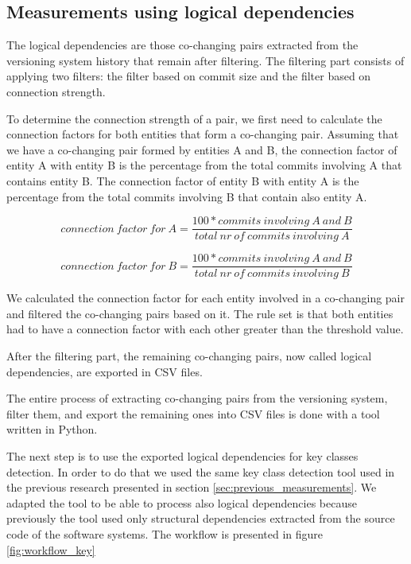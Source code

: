 \documentclass[12pt]{mitthesis}
\begin{document}
\subsection{Measurements using logical dependencies}
\label{sec:current_measurements}

The logical dependencies are those co-changing pairs extracted from the versioning system history that remain after filtering. The filtering part consists of applying two filters: the filter based on commit size and the filter based on connection strength. 

To determine the connection strength of a pair, we first need to calculate the connection factors for both entities that form a co-changing pair.
Assuming that we have a co-changing pair formed by entities A and B, the connection factor of entity A with entity B is the percentage from the total commits involving A that contains entity B. The connection factor of entity B with entity A is the percentage from the total commits involving B that contain also entity A.

\[ connection\ factor\ for\ A 
  = \dfrac{100 * commits\ involving\ A\ and\ B}{total\ nr\ of\ commits\ involving\ A}
\]

\[ connection\ factor\ for\ B 
  = \dfrac{100 * commits\ involving\ A\ and\ B}{total\ nr\ of\ commits\ involving\ B}
\]

We calculated the connection factor for each entity involved in a co-changing pair and filtered the co-changing pairs based on it. The rule set is that both entities had to have a connection factor with each other greater than the threshold value.

After the filtering part, the remaining co-changing pairs, now called logical dependencies, are exported in CSV files.

The entire process of extracting co-changing pairs from the versioning system, filter them, and export the remaining ones into CSV files is done with a tool written in Python.

The next step is to use the exported logical dependencies for key classes detection. In order to do that we used the same key class detection tool used in the previous research presented in section \ref{sec:previous_measurements}. We adapted the tool to be able to process also logical dependencies because previously the tool used only structural dependencies extracted from the source code of the software systems. 
The workflow is presented in figure \ref{fig:workflow_key}
\end{document}

